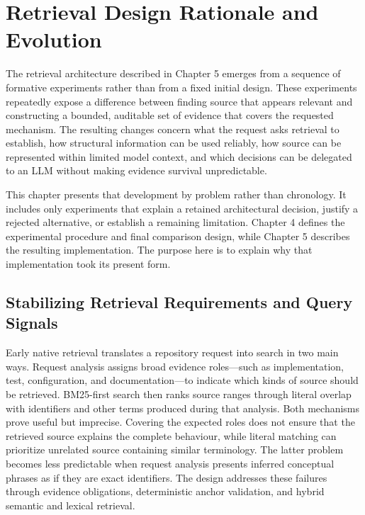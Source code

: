 \chapter{Retrieval Design Rationale and Evolution}\label{ch:retrieval-design-rationale-and-evolution}

The retrieval architecture described in Chapter 5 emerges from a sequence of formative experiments rather than from a fixed initial design. These experiments repeatedly expose a difference between finding source that appears relevant and constructing a bounded, auditable set of evidence that covers the requested mechanism. The resulting changes concern what the request asks retrieval to establish, how structural information can be used reliably, how source can be represented within limited model context, and which decisions can be delegated to an LLM without making evidence survival unpredictable.

This chapter presents that development by problem rather than chronology. It includes only experiments that explain a retained architectural decision, justify a rejected alternative, or establish a remaining limitation. Chapter 4 defines the experimental procedure and final comparison design, while Chapter 5 describes the resulting implementation. The purpose here is to explain why that implementation took its present form.

\section{Stabilizing Retrieval Requirements and Query Signals}\label{sec:stabilizing-retrieval-requirements-and-query-signals}

Early native retrieval translates a repository request into search in two main ways. Request analysis assigns broad evidence roles---such as implementation, test, configuration, and documentation---to indicate which kinds of source should be retrieved. BM25-first search then ranks source ranges through literal overlap with identifiers and other terms produced during that analysis. Both mechanisms prove useful but imprecise. Covering the expected roles does not ensure that the retrieved source explains the complete behaviour, while literal matching can prioritize unrelated source containing similar terminology. The latter problem becomes less predictable when request analysis presents inferred conceptual phrases as if they are exact identifiers. The design addresses these failures through evidence obligations, deterministic anchor validation, and hybrid semantic and lexical retrieval.


